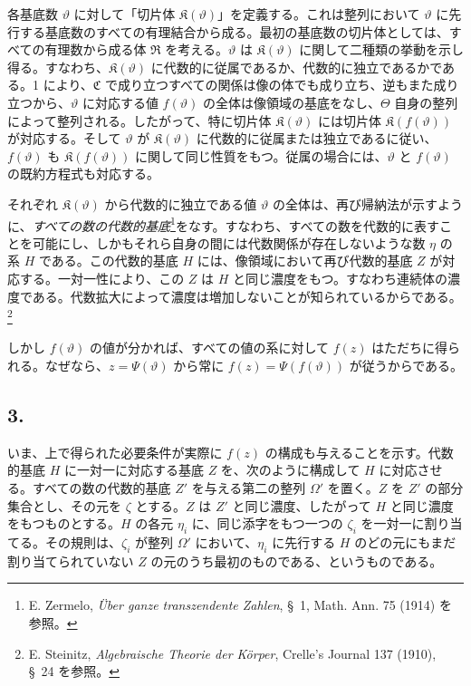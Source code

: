 \documentclass[11pt]{article}
\begin{document}
各基底数 $\vartheta$ に対して「切片体 $\mathfrak K(\vartheta)$」を定義する。これは整列において $\vartheta$ に先行する基底数のすべての有理結合から成る。最初の基底数の切片体としては、すべての有理数から成る体 $\mathfrak R$ を考える。$\vartheta$ は $\mathfrak K(\vartheta)$ に関して二種類の挙動を示し得る。すなわち、$\mathfrak K(\vartheta)$ に代数的に従属であるか、代数的に独立であるかである。1 により、$\mathfrak C$ で成り立つすべての関係は像の体でも成り立ち、逆もまた成り立つから、$\vartheta$ に対応する値 $f(\vartheta)$ の全体は像領域の基底をなし、$\Theta$ 自身の整列によって整列される。したがって、特に切片体 $\mathfrak K(\vartheta)$ には切片体 $\mathfrak K(f(\vartheta))$ が対応する。そして $\vartheta$ が $\mathfrak K(\vartheta)$ に代数的に従属または独立であるに従い、$f(\vartheta)$ も $\mathfrak K(f(\vartheta))$ に関して同じ性質をもつ。従属の場合には、$\vartheta$ と $f(\vartheta)$ の既約方程式も対応する。

それぞれ $\mathfrak K(\vartheta)$ から代数的に独立である値 $\vartheta$ の全体は、再び帰納法が示すように、\emph{すべての数の代数的基底}\footnote{E. Zermelo, \emph{Über ganze transzendente Zahlen}, \S\ 1, Math. Ann. 75 (1914) を参照。}をなす。すなわち、すべての数を代数的に表すことを可能にし、しかもそれら自身の間には代数関係が存在しないような数 $\eta$ の系 $H$ である。この代数的基底 $H$ には、像領域において再び代数的基底 $Z$ が対応する。一対一性により、この $Z$ は $H$ と同じ濃度をもつ。すなわち連続体の濃度である。代数拡大によって濃度は増加しないことが知られているからである。\footnote{E. Steinitz, \emph{Algebraische Theorie der Körper}, Crelle's Journal 137 (1910), \S\ 24 を参照。}

しかし $f(\vartheta)$ の値が分かれば、すべての値の系に対して $f(z)$ はただちに得られる。なぜなら、$z=\Psi(\vartheta)$ から常に $f(z)=\Psi(f(\vartheta))$ が従うからである。

\subsection*{3.}

いま、上で得られた必要条件が実際に $f(z)$ の構成も与えることを示す。代数的基底 $H$ に一対一に対応する基底 $Z$ を、次のように構成して $H$ に対応させる。すべての数の代数的基底 $Z'$ を与える第二の整列 $\Omega'$ を置く。$Z$ を $Z'$ の部分集合とし、その元を $\zeta$ とする。$Z$ は $Z'$ と同じ濃度、したがって $H$ と同じ濃度をもつものとする。$H$ の各元 $\eta_i$ に、同じ添字をもつ一つの $\zeta_i$ を一対一に割り当てる。その規則は、$\zeta_i$ が整列 $\Omega'$ において、$\eta_i$ に先行する $H$ のどの元にもまだ割り当てられていない $Z$ の元のうち最初のものである、というものである。
\end{document}
